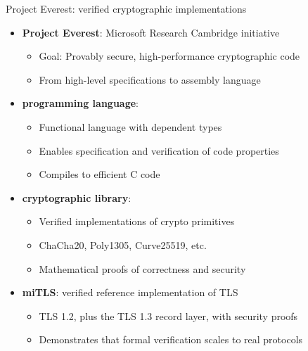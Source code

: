 \ifdefined\PRESENTATION\else\PassOptionsToClass{handout}{beamer}\fi\documentclass[aspectratio=169, lualatex]{beamer}
\begin{document}
\begin{frame}{Project Everest: verified cryptographic implementations}
	\begin{itemize}
		\item \textbf{Project Everest}: Microsoft Research Cambridge initiative
		      \begin{itemize}
			      \item Goal: Provably secure, high-performance cryptographic code
			      \item From high-level specifications to assembly language
		      \end{itemize}
		\item \textbf{\fstar programming language}:
		      \begin{itemize}
			      \item Functional language with dependent types
			      \item Enables specification and verification of code properties
			      \item Compiles to efficient C code
		      \end{itemize}
		\item \textbf{\haclstar cryptographic library}:
		      \begin{itemize}
			      \item Verified implementations of crypto primitives
			      \item ChaCha20, Poly1305, Curve25519, etc.
			      \item Mathematical proofs of correctness and security
		      \end{itemize}
		\item \textbf{miTLS}: verified reference implementation of TLS
		      \begin{itemize}
			      \item TLS 1.2, plus the TLS 1.3 record layer, with security proofs
			      \item Demonstrates that formal verification scales to real protocols
		      \end{itemize}
	\end{itemize}
\end{frame}
\end{document}
